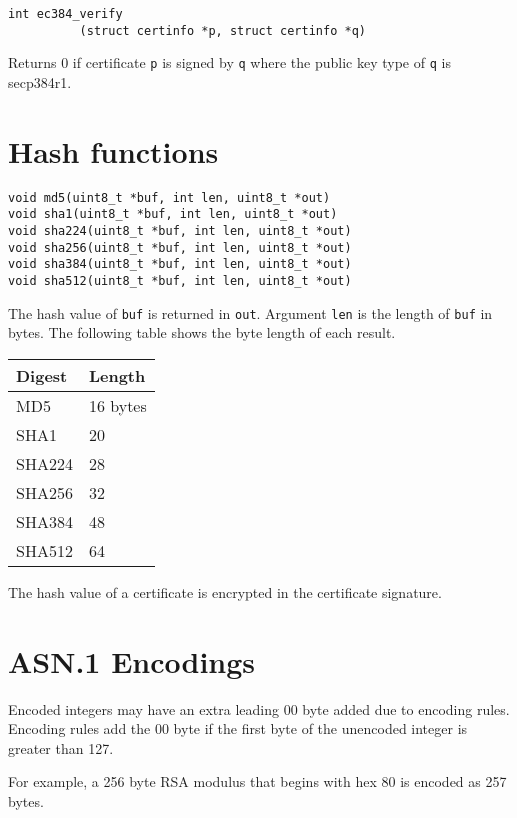 \documentclass[12pt]{article}
\begin{document}
\bigskip
\bigskip
\begin{verbatim}
int ec384_verify
          (struct certinfo *p, struct certinfo *q)
\end{verbatim}

\noindent
Returns 0 if certificate {\tt p} is signed by {\tt q}
where the public key type of {\tt q} is secp384r1.

\newpage
\section{Hash functions}

\bigskip
\bigskip
\begin{verbatim}
void md5(uint8_t *buf, int len, uint8_t *out)
void sha1(uint8_t *buf, int len, uint8_t *out)
void sha224(uint8_t *buf, int len, uint8_t *out)
void sha256(uint8_t *buf, int len, uint8_t *out)
void sha384(uint8_t *buf, int len, uint8_t *out)
void sha512(uint8_t *buf, int len, uint8_t *out)
\end{verbatim}

\noindent
The hash value of {\tt buf} is returned in {\tt out}.
Argument {\tt len} is the length of {\tt buf} in bytes.
The following table shows the byte length of each result.

\bigskip
\noindent
\begin{tabular}{|l|l|}
\hline
Digest & Length\\
\hline
MD5 & 16 bytes\\
SHA1 & 20\\
SHA224 & 28\\
SHA256 & 32\\
SHA384 & 48\\
SHA512 & 64\\
\hline
\end{tabular}

\bigskip
\noindent
The hash value of a certificate is encrypted in the certificate signature.

\newpage
\section{ASN.1 Encodings}

\noindent
Encoded integers may have an extra leading 00 byte added due to encoding rules.
Encoding rules add the 00 byte if the first byte of the unencoded integer is greater than 127.

\bigskip
\noindent
For example, a 256 byte RSA modulus that begins with hex 80 is encoded as 257 bytes.
\end{document}
